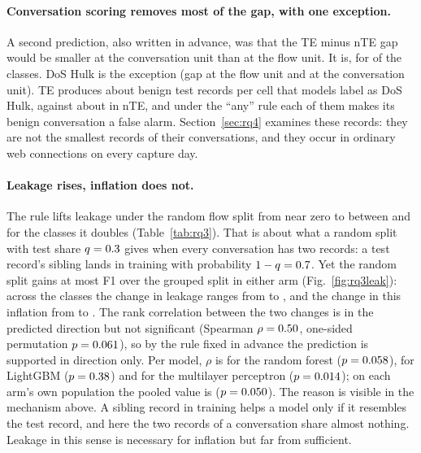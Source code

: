 \documentclass[pdflatex,sn-mathphys-num]{sn-jnl}
\theoremstyle{thmstyleone}%
\theoremstyle{thmstylethree}%
\begin{document}
\paragraph{Conversation scoring removes most of the gap, with one exception.} A second prediction, also written in advance, was that the TE minus nTE gap would be smaller at the conversation unit than at the flow unit. It is, for \RQthreeSmallerAtConv{} of the \RQthreeClasses{} classes. DoS Hulk is the exception (gap \RQthreeHulkGapFlow{} at the flow unit and \RQthreeHulkGapConv{} at the conversation unit). TE produces about \RQthreeHulkFalseTe{} benign test records per cell that models label as DoS Hulk, against about \RQthreeHulkFalseNte{} in nTE, and under the ``any'' rule each of them makes its benign conversation a false alarm. Section~\ref{sec:rq4} examines these records: they are not the smallest records of their conversations, and they occur in ordinary web connections on every capture day.

\paragraph{Leakage rises, inflation does not.} The rule lifts leakage under the random flow split from near zero to between \RQthreeLeakTeMin{} and \RQthreeLeakTeMax{} for the classes it doubles (Table~\ref{tab:rq3}). That is about what a random split with test share $q = 0.3$ gives when every conversation has two records: a test record's sibling lands in training with probability $1 - q = 0.7$. Yet the random split gains at most \RQthreeInflMax{} F1 over the grouped split in either arm (Fig.~\ref{fig:rq3leak}): across the \RQthreeClasses{} classes the change in leakage ranges from \RQthreeDLeakMin{} to \RQthreeDLeakMax{}, and the change in this inflation from \RQthreeDInflMin{} to \RQthreeDInflMax{}. The rank correlation between the two changes is in the predicted direction but not significant (Spearman $\rho = 0.50$, one-sided permutation $p = 0.061$), so by the rule fixed in advance the prediction is supported in direction only. Per model, $\rho$ is \RQthreeRhoRf{} for the random forest ($p = 0.058$), \RQthreeRhoLgbm{} for LightGBM ($p = 0.38$) and \RQthreeRhoMlp{} for the multilayer perceptron ($p = 0.014$); on each arm's own population the pooled value is \RQthreeRhoOwn{} ($p = 0.050$). The reason is visible in the mechanism above. A sibling record in training helps a model only if it resembles the test record, and here the two records of a conversation share almost nothing. Leakage in this sense is necessary for inflation but far from sufficient.
\end{document}
